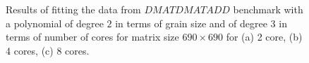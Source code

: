 \vspace{\baselineskip}	
\begin{figure}[H]
	\centering
	\caption{Results of fitting the data from $DMATDMATADD$ benchmark with a polynomial of degree $2$ in terms of grain size and of degree $3$ in terms of number of cores for matrix size $690\times690$ for (a) 2 core, (b) 4 cores, (c) 8 cores.}	
	\label{fig18}
\end{figure}

